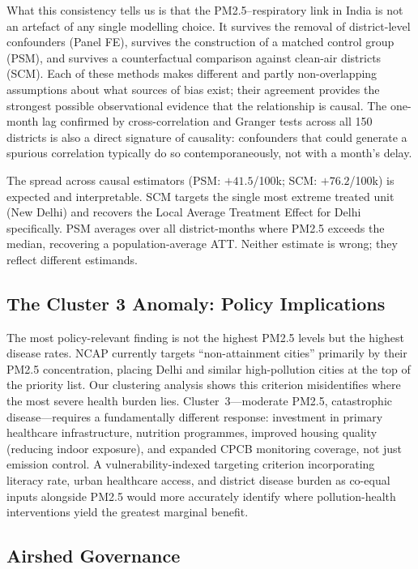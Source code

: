 \documentclass{article}
\begin{document}
What this consistency tells us is that the PM2.5--respiratory link in India is not an
artefact of any single modelling choice. It survives the removal of district-level
confounders (Panel FE), survives the construction of a matched control group (PSM),
and survives a counterfactual comparison against clean-air districts (SCM). Each of these
methods makes different and partly non-overlapping assumptions about what sources of bias
exist; their agreement provides the strongest possible observational evidence that
the relationship is causal. The one-month lag confirmed by cross-correlation and Granger
tests across all 150 districts is also a direct signature of causality: confounders that
could generate a spurious correlation typically do so contemporaneously, not with a
month's delay.

The spread across causal estimators (PSM: $+41.5$/100k; SCM: $+76.2$/100k) is expected
and interpretable. SCM targets the single most extreme treated unit (New Delhi) and
recovers the Local Average Treatment Effect for Delhi specifically. PSM averages over all
district-months where PM2.5 exceeds the median, recovering a population-average ATT.
Neither estimate is wrong; they reflect different estimands.

\subsection{The Cluster 3 Anomaly: Policy Implications}

The most policy-relevant finding is not the highest PM2.5 levels but the highest disease
rates. NCAP currently targets ``non-attainment cities'' primarily by their PM2.5
concentration, placing Delhi and similar high-pollution cities at the top of the priority
list. Our clustering analysis shows this criterion misidentifies where the most severe
health burden lies. Cluster~3---moderate PM2.5, catastrophic disease---requires a
fundamentally different response: investment in primary healthcare infrastructure,
nutrition programmes, improved housing quality (reducing indoor exposure), and expanded
CPCB monitoring coverage, not just emission control. A vulnerability-indexed targeting
criterion incorporating literacy rate, urban healthcare access, and district disease
burden as co-equal inputs alongside PM2.5 would more accurately identify where
pollution-health interventions yield the greatest marginal benefit.

\subsection{Airshed Governance}
\end{document}
